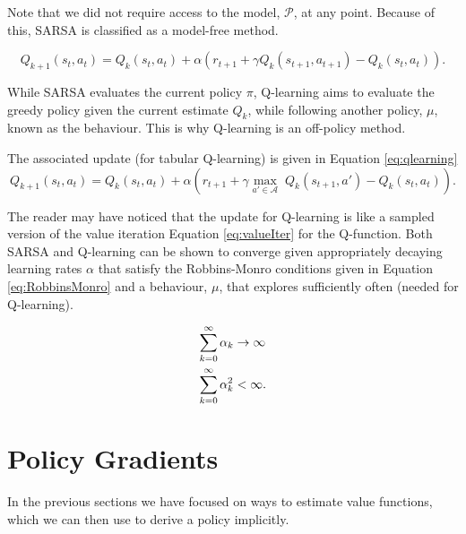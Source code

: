 \documentclass{report}
\numberwithin{equation}{section}
\numberwithin{figure}{section}
\numberwithin{table}{section}
\numberwithin{algorithm}{section}
\begin{document}
Note that we did not require access to the model, $\mathcal{P}$, at 
any point. Because of this, SARSA is classified as a model-free method.

\begin{equation}\label{eq:sarsa}
  Q_{k+1}(s_t, a_t) = Q_{k}(s_t, a_t) + \alpha (r_{t+1} + \gamma Q_{k}(s_{t+1}, a_{t+1}) - Q_{k}(s_t, a_t)).
\end{equation}


While SARSA evaluates the current policy $\pi$, Q-learning aims 
to evaluate the greedy policy given the current estimate $Q_{k}$, 
while following another policy, $\mu$, known as the behaviour. 
This is why Q-learning is an off-policy method.

The associated update (for tabular Q-learning) is given in Equation 
\ref{eq:qlearning}
\begin{equation}\label{eq:qlearning}
  Q_{k+1}(s_t, a_t) = Q_{k}(s_t, a_t) + \alpha \left(r_{t+1} + \gamma \max_{a'\in\mathcal{A}}\;Q_{k}(s_{t+1}, a') - Q_{k}(s_t, a_t)\right).
\end{equation}

The reader may have noticed that the update for Q-learning is like 
a sampled version of the value iteration Equation \ref{eq:valueIter} 
for the Q-function. Both SARSA and Q-learning can be shown to 
converge given appropriately decaying learning rates $\alpha$ 
that satisfy the Robbins-Monro conditions given in Equation 
\ref{eq:RobbinsMonro} and a behaviour, $\mu$, that explores 
sufficiently often (needed for Q-learning).

\begin{align}\label{eq:RobbinsMonro}
  \sum_{k=0}^\infty \alpha_k&\rightarrow \infty\notag\\
  \sum_{k=0}^\infty \alpha_k^2&< \infty.
\end{align}

\section{Policy Gradients}\label{sec:PolicyGrads}
In the previous sections we have focused on ways to estimate 
value functions, which we can then use to derive a policy implicitly. 
\end{document}
